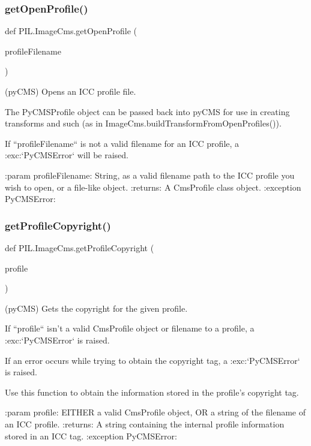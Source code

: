 \subsubsection{\texorpdfstring{get\+Open\+Profile()}{getOpenProfile()}}
{\footnotesize\ttfamily def P\+I\+L.\+Image\+Cms.\+get\+Open\+Profile (\begin{DoxyParamCaption}\item[{}]{profile\+Filename }\end{DoxyParamCaption})}

\begin{DoxyVerb}(pyCMS) Opens an ICC profile file.

The PyCMSProfile object can be passed back into pyCMS for use in creating
transforms and such (as in ImageCms.buildTransformFromOpenProfiles()).

If ``profileFilename`` is not a valid filename for an ICC profile,
a :exc:`PyCMSError` will be raised.

:param profileFilename: String, as a valid filename path to the ICC profile
    you wish to open, or a file-like object.
:returns: A CmsProfile class object.
:exception PyCMSError:
\end{DoxyVerb}
 \mbox{\label{namespacePIL_1_1ImageCms_a5d31e3216a3b8887681a0f34f9f1f5e6}} 
\subsubsection{\texorpdfstring{get\+Profile\+Copyright()}{getProfileCopyright()}}
{\footnotesize\ttfamily def P\+I\+L.\+Image\+Cms.\+get\+Profile\+Copyright (\begin{DoxyParamCaption}\item[{}]{profile }\end{DoxyParamCaption})}

\begin{DoxyVerb}(pyCMS) Gets the copyright for the given profile.

If ``profile`` isn't a valid CmsProfile object or filename to a profile, a
:exc:`PyCMSError` is raised.

If an error occurs while trying to obtain the copyright tag,
a :exc:`PyCMSError` is raised.

Use this function to obtain the information stored in the profile's
copyright tag.

:param profile: EITHER a valid CmsProfile object, OR a string of the
    filename of an ICC profile.
:returns: A string containing the internal profile information stored in
    an ICC tag.
:exception PyCMSError:
\end{DoxyVerb}
 \mbox{\label{namespacePIL_1_1ImageCms_a472a2954f00eaa512e854e09c29ae822}} 
